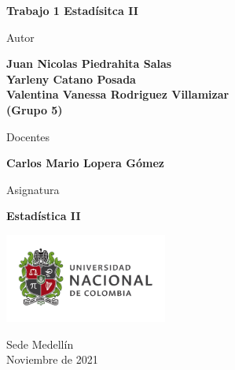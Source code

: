 \begin{titlepage}
   \Large{
   \begin{center}
       \vspace*{1cm}

       \textbf{Trabajo 1 Estadísitca II}

            
       \vspace{1cm}
       
       Autor
       
       \vspace{0.5cm}
        
        
       \textbf{Juan Nicolas Piedrahita Salas} \\
       \textbf{Yarleny Catano Posada} \\
       \textbf{Valentina Vanessa Rodriguez Villamizar} \\
       \textbf{(Grupo 5)} \\
       
       
              \vspace{1cm}
       
       Docentes
       
       \vspace{0.5cm}

	\textbf{Carlos Mario Lopera Gómez}\\
       
       \vspace{0.4cm}

       \vspace{1.5cm}
       
       Asignatura
       
       \vspace{0.5cm}

       \textbf{Estadística II}

       \vfill

            
       \vspace{0.1cm}
     
       \includegraphics[width=0.4\textwidth]{logounal.png}
            
       Sede Medellín\\
       Noviembre de 2021
       
   \end{center}
   }
\end{titlepage}
